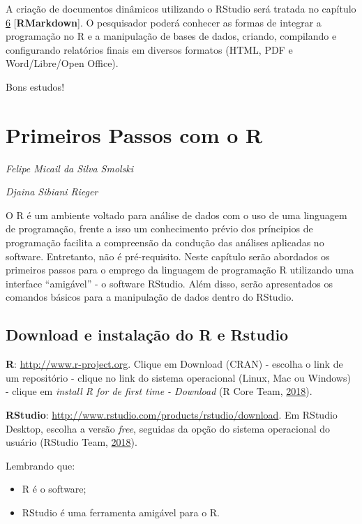 \documentclass[12pt,brazil,oneside]{book}
\providecommand{\tightlist}{%
  \setlength{\itemsep}{0pt}\setlength{\parskip}{0pt}}
\begin{document}
A criação de documentos dinâmicos utilizando o RStudio será tratada no capítulo \protect\hyperlink{rmark}{6} {[}\textbf{RMarkdown}{]}. O pesquisador poderá conhecer as formas de integrar a programação no R e a manipulação de bases de dados, criando, compilando e configurando relatórios finais em diversos formatos (HTML, PDF e Word/Libre/Open Office).

Bons estudos!

\hypertarget{intro}{%
\chapter{Primeiros Passos com o R}\label{intro}}

\emph{Felipe Micail da Silva Smolski}

\emph{Djaina Sibiani Rieger}

\begin{flushright}
\emph{}
\end{flushright}

O R é um ambiente voltado para análise de dados com o uso de uma linguagem de programação, frente a isso um conhecimento prévio dos príncipios de programação facilita a compreensão da condução das análises aplicadas no software. Entretanto, não é pré-requisito. Neste capítulo serão abordados os primeiros passos para o emprego da linguagem de programação R utilizando uma interface ``amigável'' - o software RStudio. Além disso, serão apresentados os comandos básicos para a manipulação de dados dentro do RStudio.

\hypertarget{download-e-instalacao-do-r-e-rstudio}{%
\section{Download e instalação do R e Rstudio}\label{download-e-instalacao-do-r-e-rstudio}}

\textbf{R}: \url{http://www.r-project.org}. Clique em Download (CRAN) - escolha o link de um repositório - clique no link do sistema operacional (Linux, Mac ou Windows) - clique em \emph{install R for de first time - Download} (R Core Team, \protect\hyperlink{ref-rcore}{2018}).

\textbf{RStudio}: \url{http://www.rstudio.com/products/rstudio/download}. Em RStudio Desktop, escolha a versão \emph{free}, seguidas da opção do sistema operacional do usuário (RStudio Team, \protect\hyperlink{ref-teamrstudio}{2018}).

Lembrando que:

\begin{itemize}
\tightlist
\item
  R é o software;
\item
  RStudio é uma ferramenta amigável para o R.
\end{itemize}
\end{document}

